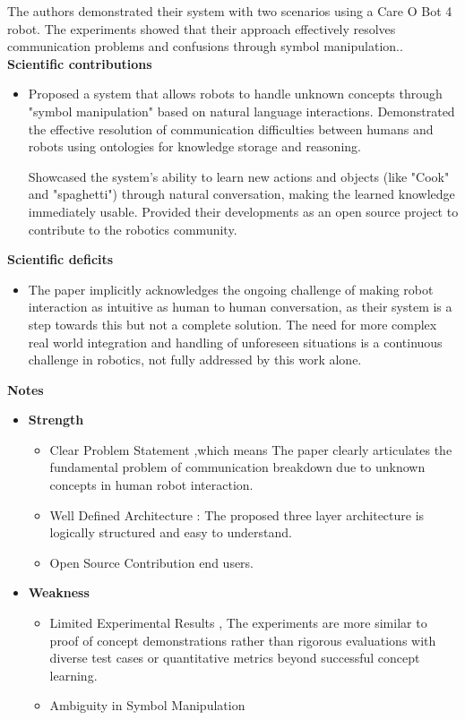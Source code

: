 \documentclass[report.tex]{subfiles}
\begin{document}
\noindent\textbf{}The authors demonstrated their system with two scenarios using a Care O Bot 4 robot. The
experiments showed that their approach effectively resolves communication problems and
confusions through symbol manipulation..\\


\noindent\textbf{Scientific contributions} 
\begin{itemize}
        \item Proposed a system that allows robots to handle unknown concepts through "symbol
manipulation" based on natural language interactions.
 Demonstrated the effective resolution of communication difficulties between humans and
robots using ontologies for knowledge storage and reasoning.

 Showcased the system's ability to learn new actions and objects (like "Cook" and
"spaghetti") through natural conversation, making the learned knowledge immediately
usable. 
 Provided their developments as an open source project to contribute to the robotics
community.
        
\end{itemize}

\noindent\textbf{Scientific deficits} 
\begin{itemize}
        \item The paper implicitly acknowledges the ongoing challenge of making robot interaction as
intuitive as human to human conversation, as their system is a step towards this but not a
complete solution.  
      The need for more complex real world integration and handling of unforeseen situations is a
continuous challenge in robotics, not fully addressed by this work alone.
       
\end{itemize}

\noindent\textbf{Notes}
\begin{itemize}
    \item \noindent\textbf {Strength}
    \begin{itemize}
        \item Clear Problem Statement ,which means The paper clearly articulates the fundamental
problem of communication breakdown due to unknown concepts in human robot interaction.
        \item Well Defined Architecture : The proposed three layer architecture is logically structured
and easy to understand.
        \item Open Source Contribution
end users.
       
    \end{itemize}
    
    \item \noindent\textbf{Weakness}
    \begin{itemize}
        \item Limited Experimental Results , The experiments are more similar to proof of concept
demonstrations rather than rigorous evaluations with diverse test cases or quantitative
metrics beyond successful concept learning.
        \item Ambiguity in Symbol Manipulation
    \end{itemize}
\end{itemize}
\end{document}
